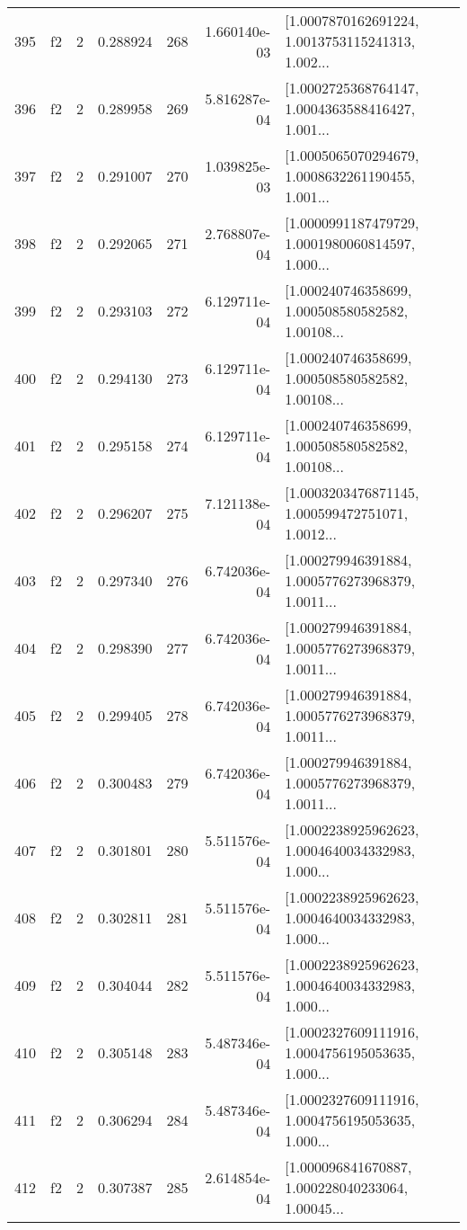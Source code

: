\begin{tabular}{lllrlrl}
395 &  f2 &   2 &  0.288924 &  268 &  1.660140e-03 &  [1.0007870162691224, 1.0013753115241313, 1.002... \\
396 &  f2 &   2 &  0.289958 &  269 &  5.816287e-04 &  [1.0002725368764147, 1.0004363588416427, 1.001... \\
397 &  f2 &   2 &  0.291007 &  270 &  1.039825e-03 &  [1.0005065070294679, 1.0008632261190455, 1.001... \\
398 &  f2 &   2 &  0.292065 &  271 &  2.768807e-04 &  [1.0000991187479729, 1.0001980060814597, 1.000... \\
399 &  f2 &   2 &  0.293103 &  272 &  6.129711e-04 &  [1.000240746358699, 1.000508580582582, 1.00108... \\
400 &  f2 &   2 &  0.294130 &  273 &  6.129711e-04 &  [1.000240746358699, 1.000508580582582, 1.00108... \\
401 &  f2 &   2 &  0.295158 &  274 &  6.129711e-04 &  [1.000240746358699, 1.000508580582582, 1.00108... \\
402 &  f2 &   2 &  0.296207 &  275 &  7.121138e-04 &  [1.0003203476871145, 1.000599472751071, 1.0012... \\
403 &  f2 &   2 &  0.297340 &  276 &  6.742036e-04 &  [1.000279946391884, 1.0005776273968379, 1.0011... \\
404 &  f2 &   2 &  0.298390 &  277 &  6.742036e-04 &  [1.000279946391884, 1.0005776273968379, 1.0011... \\
405 &  f2 &   2 &  0.299405 &  278 &  6.742036e-04 &  [1.000279946391884, 1.0005776273968379, 1.0011... \\
406 &  f2 &   2 &  0.300483 &  279 &  6.742036e-04 &  [1.000279946391884, 1.0005776273968379, 1.0011... \\
407 &  f2 &   2 &  0.301801 &  280 &  5.511576e-04 &  [1.0002238925962623, 1.0004640034332983, 1.000... \\
408 &  f2 &   2 &  0.302811 &  281 &  5.511576e-04 &  [1.0002238925962623, 1.0004640034332983, 1.000... \\
409 &  f2 &   2 &  0.304044 &  282 &  5.511576e-04 &  [1.0002238925962623, 1.0004640034332983, 1.000... \\
410 &  f2 &   2 &  0.305148 &  283 &  5.487346e-04 &  [1.0002327609111916, 1.0004756195053635, 1.000... \\
411 &  f2 &   2 &  0.306294 &  284 &  5.487346e-04 &  [1.0002327609111916, 1.0004756195053635, 1.000... \\
412 &  f2 &   2 &  0.307387 &  285 &  2.614854e-04 &  [1.000096841670887, 1.000228040233064, 1.00045... \\

\end{tabular}
